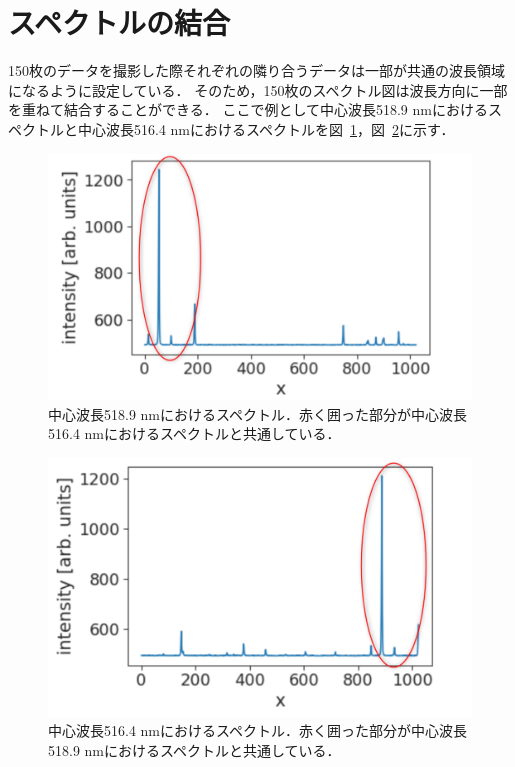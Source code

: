 \section{スペクトルの結合}
150枚のデータを撮影した際それぞれの隣り合うデータは一部が共通の波長領域になるように設定している．
そのため，150枚のスペクトル図は波長方向に一部を重ねて結合することができる．
ここで例として中心波長518.9 nmにおけるスペクトルと中心波長516.4 nmにおけるスペクトルを図\ \ref{fig:spectrum_example105}，図\ \ref{fig:spectrum_example106}に示す．
\begin{figure}[htbp]
    \centering
    \includegraphics[scale=0.6]{figure/spectrum_example_105.pdf}
    \caption{中心波長518.9 nmにおけるスペクトル．赤く囲った部分が中心波長516.4 nmにおけるスペクトルと共通している．}
    \label{fig:spectrum_example105}
\end{figure}
\begin{figure}[htbp]
    \centering
    \includegraphics[scale=0.6]{figure/spectrum_example_106.pdf}
    \caption{中心波長516.4 nmにおけるスペクトル．赤く囲った部分が中心波長518.9 nmにおけるスペクトルと共通している．}
    \label{fig:spectrum_example106}
\end{figure}
